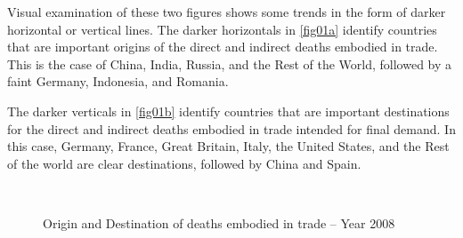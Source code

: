 \documentclass[a4paper,12pt, ]{article}
\begin{document}
Visual examination of these two figures shows some trends in the form of darker horizontal or vertical lines. The darker horizontals in \ref{fig01a} identify countries that are important origins of the direct and indirect deaths embodied in trade. This is the case of China, India, Russia, and the Rest of the World, followed by a faint Germany, Indonesia, and Romania.

The darker verticals in \ref{fig01b} identify countries that are important destinations for the direct and indirect deaths embodied in trade intended for final demand. In this case, Germany, France, Great Britain, Italy, the United States, and the Rest of the world are clear destinations, followed by China and Spain.


\begin{figure}
\centering
{}
\\
\caption{Origin and Destination of deaths embodied in trade -- Year 2008}
\label{fig01}
\end{figure}
\end{document}
